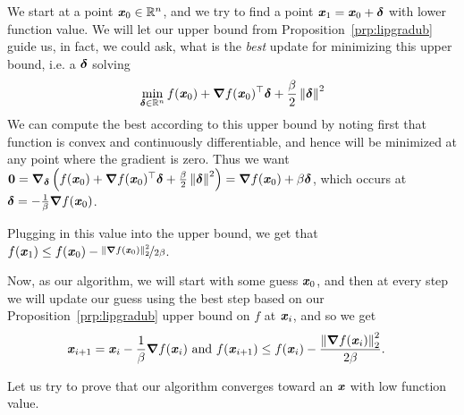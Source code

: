 We start at a point $\boldsymbol{\mathit{x}}_0 \in \mathbb{R}^n$, and we try to find a
point $\boldsymbol{\mathit{x}}_1 = \boldsymbol{\mathit{x}}_0 +\boldsymbol{\delta}$ with lower function value.
We will let our upper bound from Proposition~\ref{prp:lipgradub} guide
us, in fact, we could ask, what is the \emph{best} update for
minimizing this upper bound, i.e. a $\boldsymbol{\delta}$ solving
\[
  \min_{\boldsymbol{\delta} \in \mathbb{R}^n}
  f(\boldsymbol{\mathit{x}}_{0})
     + \boldsymbol{\nabla} f(\boldsymbol{\mathit{x}}_{0})^\top\boldsymbol{\delta}
      + \frac{\beta}{2} \left\| \boldsymbol{\delta} \right\|^2
\]
We can compute the best according to this upper bound by noting
first that function is convex and continuously differentiable,
and hence will be minimized at any point where the gradient is zero.
Thus we want
$\boldsymbol{0} = \boldsymbol{\nabla}_{\boldsymbol{\delta}} \left(
 f(\boldsymbol{\mathit{x}}_{0})
     + \boldsymbol{\nabla} f(\boldsymbol{\mathit{x}}_{0})^\top\boldsymbol{\delta}
     + \frac{\beta}{2} \left\| \boldsymbol{\delta} \right\|^2
\right)
=
\boldsymbol{\nabla} f(\boldsymbol{\mathit{x}}_{0})
+
\beta \boldsymbol{\delta}
$, which occurs at
$\boldsymbol{\delta} = -\frac{1}{\beta}\boldsymbol{\nabla} f(\boldsymbol{\mathit{x}}_{0})$.

Plugging in this value into the upper bound, we get that
$f(\boldsymbol{\mathit{x}}_1) \leq f(\boldsymbol{\mathit{x}}_0) - \nicefrac{\left\| \boldsymbol{\nabla} f(\boldsymbol{\mathit{x}}_{0}) \right\|_2^2}{2\beta}$.

Now, as our algorithm, we will start with some guess $\boldsymbol{\mathit{x}}_0$, and then
at every step we will update our guess using the best step based on
our Proposition~\ref{prp:lipgradub} upper bound on $f$ at $\boldsymbol{\mathit{x}}_i$, and so we get
\begin{align}
\label{eq:gdstep}
  \boldsymbol{\mathit{x}}_{i+1} = \boldsymbol{\mathit{x}}_{i}-\frac{1}{\beta}\boldsymbol{\nabla} f(\boldsymbol{\mathit{x}}_{i})
  \text{ and }
    f(\boldsymbol{\mathit{x}}_{i+1}) &\leq f(\boldsymbol{\mathit{x}}_{i}) - \frac{\left\| \boldsymbol{\nabla}
                 f(\boldsymbol{\mathit{x}}_{i}) \right\|_2^2}{2\beta}
  .
\end{align}


Let us try to prove that our algorithm converges toward an $\boldsymbol{\mathit{x}}$ with low
function value.

